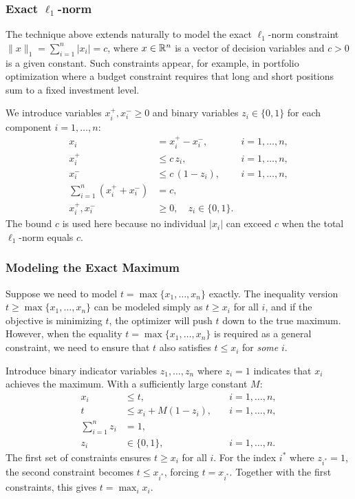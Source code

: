 \subsubsection{Exact $\ell_1$-norm}
The technique above extends naturally to model the exact $\ell_1$-norm constraint
$\|x\|_1 = \sum_{i=1}^{n} |x_i| = c$,
where $x \in \mathbb{R}^n$ is a vector of decision variables and $c > 0$ is a given constant.
Such constraints appear, for example, in portfolio optimization where a budget constraint requires that long and short positions sum to a fixed investment level.

We introduce variables $x_i^+, x_i^- \geq 0$ and binary variables $z_i \in \{0,1\}$ for each component $i = 1, \ldots, n$:
\begin{align*}
x_i &= x_i^+ - x_i^-, \quad &i = 1, \ldots, n,\\
x_i^+ &\leq c\, z_i, \quad &i = 1, \ldots, n,\\
x_i^- &\leq c\,(1 - z_i), \quad &i = 1, \ldots, n,\\
\sum_{i=1}^n (x_i^+ + x_i^-) &= c,\\
x_i^+, x_i^- &\geq 0, \quad z_i \in \{0,1\}.
\end{align*}
The bound $c$ is used here because no individual $|x_i|$ can exceed $c$ when the total $\ell_1$-norm equals $c$.

\subsubsection{Modeling the Exact Maximum}
Suppose we need to model $t = \max\{x_1, \ldots, x_n\}$ exactly.
The inequality version $t \geq \max\{x_1, \ldots, x_n\}$ can be modeled simply as $t \geq x_i$ for all $i$, and if the objective is minimizing $t$, the optimizer will push $t$ down to the true maximum.
However, when the equality $t = \max\{x_1, \ldots, x_n\}$ is required as a general constraint, we need to ensure that $t$ also satisfies $t \leq x_i$ for \emph{some} $i$.

Introduce binary indicator variables $z_1, \ldots, z_n$ where $z_i = 1$ indicates that $x_i$ achieves the maximum.
With a sufficiently large constant $M$:
\begin{align*}
x_i &\leq t, \quad &i = 1, \ldots, n, \\
t &\leq x_i + M(1 - z_i), \quad &i = 1, \ldots, n, \\
\sum_{i=1}^n z_i &= 1,\\
z_i &\in \{0,1\}, \quad &i = 1, \ldots, n.
\end{align*}
The first set of constraints ensures $t \geq x_i$ for all $i$.
For the index $i^*$ where $z_{i^*} = 1$, the second constraint becomes $t \leq x_{i^*}$, forcing $t = x_{i^*}$.
Together with the first constraints, this gives $t = \max_i x_i$.

